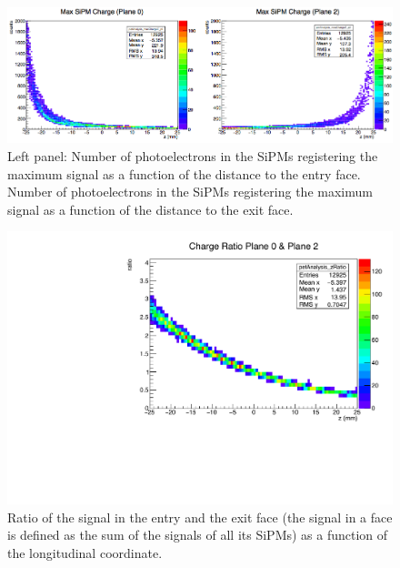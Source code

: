 \documentclass{JINST}
\begin{document}
\begin{figure}[!htb]
	\centering
	\includegraphics[scale=0.4]{img/SiPMMax.png}
	\caption{\label{fig.sipmm}  Left panel: Number of photoelectrons in the SiPMs registering the maximum signal as a function of the distance to the entry face. Number of photoelectrons in the SiPMs registering the maximum signal as a function of the distance to the exit face.}
\end{figure}

\begin{figure}[!htb]
	\centering
	\includegraphics[scale=0.7]{img/z_ratio_totalCharge.pdf}
	\caption{\label{fig.zratio}  Ratio of the signal in the entry and the exit face (the signal in a face is defined as the sum of the signals of all its SiPMs) as a function of the longitudinal coordinate.}
\end{figure}
\end{document}
